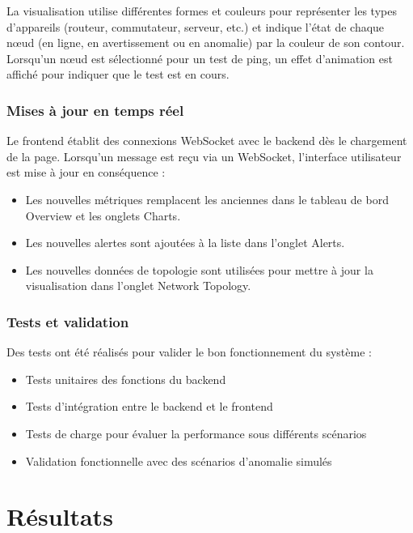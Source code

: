 \documentclass[12pt,a4paper]{report}
\begin{document}
La visualisation utilise différentes formes et couleurs pour représenter les types d'appareils (routeur, commutateur, serveur, etc.) et indique l'état de chaque nœud (en ligne, en avertissement ou en anomalie) par la couleur de son contour. Lorsqu'un nœud est sélectionné pour un test de ping, un effet d'animation est affiché pour indiquer que le test est en cours.

\subsection{Mises à jour en temps réel}
Le frontend établit des connexions WebSocket avec le backend dès le chargement de la page. Lorsqu'un message est reçu via un WebSocket, l'interface utilisateur est mise à jour en conséquence :
\begin{itemize}
    \item Les nouvelles métriques remplacent les anciennes dans le tableau de bord Overview et les onglets Charts.
    \item Les nouvelles alertes sont ajoutées à la liste dans l'onglet Alerts.
    \item Les nouvelles données de topologie sont utilisées pour mettre à jour la visualisation dans l'onglet Network Topology.
\end{itemize}

\subsection{Tests et validation}
Des tests ont été réalisés pour valider le bon fonctionnement du système :
\begin{itemize}
    \item Tests unitaires des fonctions du backend
    \item Tests d'intégration entre le backend et le frontend
    \item Tests de charge pour évaluer la performance sous différents scénarios
    \item Validation fonctionnelle avec des scénarios d'anomalie simulés
\end{itemize}

\chapter{Résultats}
\end{document}

